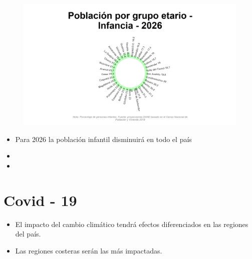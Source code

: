     \begin{figure}[H]
        \caption[Población infantil - 2018 VS 2026]{\label{ingreso_laboral_75_ciudades_minorias} }
        \begin{center}
        \includegraphics[width=\textwidth,keepaspectratio]{img/var_46456_static.png}
        \end{center}
    \end{figure}
            \begin{itemize}
                    \item Para 2026 la población infantil disminuirá en todo el país
                    \item 
                    \item 
                \end{itemize}


\section{Covid - 19}

    \begin{tcolorbox}[enhanced, colback=mycolor,colframe=mycolor,drop fuzzy shadow,watermark color=white,
                        title=Principales Resultados]
    
            \begin{itemize}
                    \item El impacto del cambio climático tendrá efectos diferenciados en las regiones del país.
                    \item Las regiones costeras serán las más impactadas.
            \end{itemize}
     
    \end{tcolorbox}
